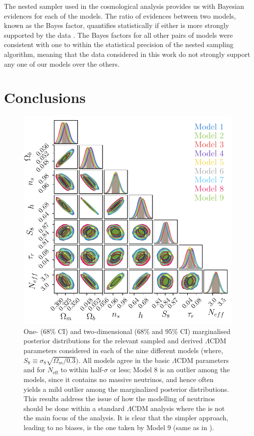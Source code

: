 \qquad The nested sampler used in the cosmological analysis provides us with Bayesian evidences for each of the models. The ratio of evidences between two models, known as the Bayes factor, quantifies statistically if either is more strongly supported by the data \citep{1995BayesFactor}. The Bayes factors for all other pairs of models were consistent with one to within the statistical precision of the nested sampling algorithm, meaning that the data considered in this work do not strongly support any one of our models over the others.

\section{Conclusions}
\begin{figure}
\begin{center}
\includegraphics[width=\columnwidth]{Neutrino-FIGS/LCDM_Params_prl_alt.pdf}
\caption[One- (68\% CI) and two-dimensional (68\% and 95\% CI) marginalised posterior distributions for the relevant sampled and derived $\Lambda$CDM parameters in each of the nine different models.]{One- (68\% CI) and two-dimensional (68\% and 95\% CI) marginalised posterior distributions for the relevant sampled and derived $\Lambda$CDM parameters considered in each of the nine different models (where, $S_8 \equiv \sigma_8\sqrt{\Omega_m/0.3})$. All models agree in the basic $\Lambda$CDM parameters and for $N_{\text{eff}}$ to within half-$\sigma$ or less; Model 8 is an outlier among the models, since it contains no massive neutrinos, and hence often yields a mild outlier among the marginalized posterior distributions. This results address the issue of how the modelling of neutrinos should be done within a standard $\Lambda$CDM analysis where the \NM{} is not the main focus of the analysis. It is clear that the simpler approach, leading to no biases, is the one taken by Model 9 (same as in \cite{PlanckCosmology2016,2018PlanckCosmology}).}
\label{fig:LCDM}
\end{center}
\end{figure}


